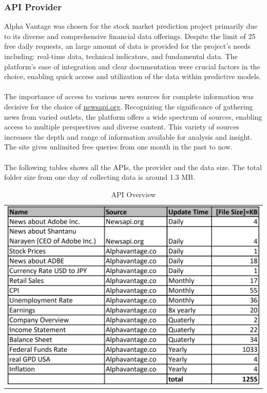 \subsubsection{API Provider}\label{sec: api provider}
Alpha Vantage was chosen for the stock market prediction project primarily due to its diverse and comprehensive financial data offerings. Despite the limit of 25 free daily requests, an large amount of data is provided for the project's needs including: real-time data, technical indicators, and fundamental data. The platform's ease of integration and clear documentation were crucial factors in the choice, enabling quick access and utilization of the data within predictive models.\\
\\
The importance of access to various news sources for complete information was decisive for the choice of \url{newsapi.org}. Recognizing the significance of gathering news from varied outlets, the platform offers a wide spectrum of sources, enabling access to multiple perspectives and diverse content. This variety of sources increases the depth and range of information available for analysis and insight. The site gives unlimited free queries from one month in the past to now.\\
\\
The following tables shows all the \ac{API}s, the provider and the data size. The total folder size from one day of collecting data is around 1.3 \ac{MB}.
\begin{table}[H]
	\centering
	\begin{tabular}{c}
		\includegraphics[width=\textwidth]{mainpart/img/api.png} \\
	\end{tabular}
	\caption{\ac{API} Overview}
	\label{tab: API}
\end{table}
